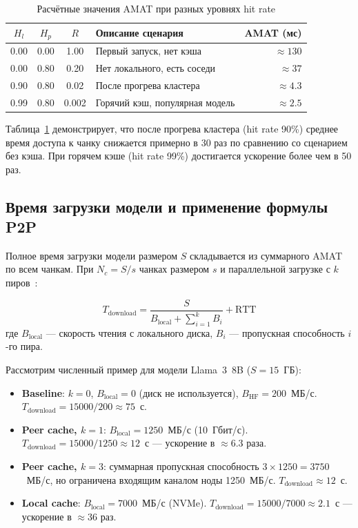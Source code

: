 \begin{table}[htbp]
\centering
\caption{Расчётные значения AMAT при разных уровнях hit rate}
\label{tab:amat_calc}
\begin{tabular}{cccp{4cm}r}
\toprule
$H_l$ & $H_p$ & $R$ & Описание сценария & AMAT (мс) \\
\midrule
0.00 & 0.00 & 1.00 & Первый запуск, нет кэша & $\approx 130$ \\
0.00 & 0.80 & 0.20 & Нет локального, есть соседи & $\approx 37$ \\
0.90 & 0.80 & 0.02 & После прогрева кластера & $\approx 4.3$ \\
0.99 & 0.80 & 0.002 & Горячий кэш, популярная модель & $\approx 2.5$ \\
\bottomrule
\end{tabular}
\end{table}

Таблица~\ref{tab:amat_calc} демонстрирует, что после прогрева кластера (hit rate 90\%) среднее время доступа к чанку снижается примерно в 30 раз по сравнению со сценарием без кэша. При горячем кэше (hit rate 99\%) достигается ускорение более чем в 50 раз.

\subsection*{Время загрузки модели и применение формулы P2P}

Полное время загрузки модели размером $S$ складывается из суммарного AMAT по всем чанкам. При $N_c = S / s$ чанках размером $s$ и параллельной загрузке с $k$ пиров~\cite{li2020caching}:

\begin{equation}
  T_{\mathrm{download}} = \frac{S}{B_{\mathrm{local}} + \sum_{i=1}^{k} B_i} + \mathrm{RTT}
  \label{eq:p2p}
\end{equation}
где $B_{\mathrm{local}}$ --- скорость чтения с локального диска, $B_i$ --- пропускная способность $i$-го пира.

Рассмотрим численный пример для модели Llama~3~8B ($S = 15$~ГБ):
\begin{itemize}[leftmargin=*]
  \item \textbf{Baseline}: $k = 0$, $B_{\mathrm{local}} = 0$ (диск не используется), $B_{\mathrm{HF}} = 200$~МБ/с. $T_{\mathrm{download}} = 15000 / 200 \approx 75$~с.
  \item \textbf{Peer cache, $k = 1$}: $B_{\mathrm{local}} = 1250$~МБ/с (10~Гбит/с). $T_{\mathrm{download}} = 15000 / 1250 \approx 12$~с --- ускорение в $\approx 6.3$ раза.
  \item \textbf{Peer cache, $k = 3$}: суммарная пропускная способность $3 \times 1250 = 3750$~МБ/с, но ограничена входящим каналом ноды 1250~МБ/с. $T_{\mathrm{download}} \approx 12$~с.
  \item \textbf{Local cache}: $B_{\mathrm{local}} = 7000$~МБ/с (NVMe). $T_{\mathrm{download}} = 15000 / 7000 \approx 2.1$~с --- ускорение в $\approx 36$ раз.
\end{itemize}

